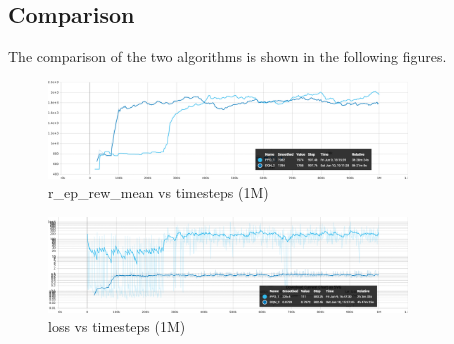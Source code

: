 \documentclass[3p,times,procedia]{elsarticle}
\begin{document}
\subsection{\textbf{Comparison}}
The comparison of the two algorithms is shown in the following figures.


\begin{figure}[H]
    \centering
    \includegraphics[width=0.85\textwidth]{figures/COMP_REW.png}
    \caption{r\_ep\_rew\_mean vs timesteps (1M)}
\end{figure}


\vspace{-2.5em}
\begin{figure}[H]
    \centering
    \includegraphics[width=0.85\textwidth]{figures/COMP_LOSS.png}
    \caption{loss vs timesteps (1M)}
\end{figure}
\end{document}
